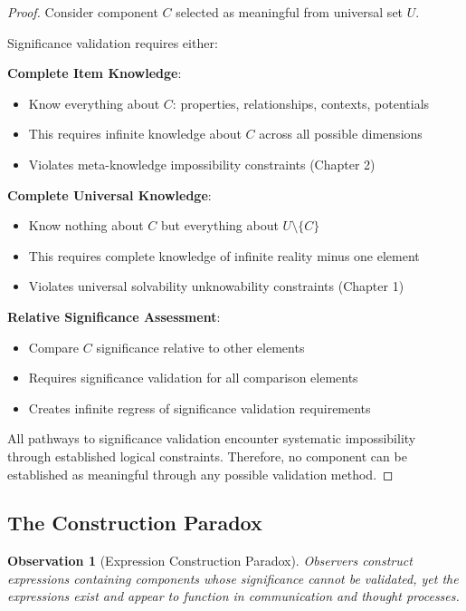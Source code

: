 \documentclass[12pt,a4paper]{article}
\newtheorem{observation}[theorem]{Observation}
\begin{document}
\begin{proof}
Consider component $C$ selected as meaningful from universal set $U$.

Significance validation requires either:

\textbf{Complete Item Knowledge}:
\begin{itemize}
\item Know everything about $C$: properties, relationships, contexts, potentials
\item This requires infinite knowledge about $C$ across all possible dimensions
\item Violates meta-knowledge impossibility constraints (Chapter 2)
\end{itemize}

\textbf{Complete Universal Knowledge}:
\begin{itemize}
\item Know nothing about $C$ but everything about $U \setminus \{C\}$
\item This requires complete knowledge of infinite reality minus one element
\item Violates universal solvability unknowability constraints (Chapter 1)
\end{itemize}

\textbf{Relative Significance Assessment}:
\begin{itemize}
\item Compare $C$ significance relative to other elements
\item Requires significance validation for all comparison elements
\item Creates infinite regress of significance validation requirements
\end{itemize}

All pathways to significance validation encounter systematic impossibility through established logical constraints. Therefore, no component can be established as meaningful through any possible validation method.
\end{proof}

\subsection{The Construction Paradox}

\begin{observation}[Expression Construction Paradox]
Observers construct expressions containing components whose significance cannot be validated, yet the expressions exist and appear to function in communication and thought processes.
\end{observation}
\end{document}
